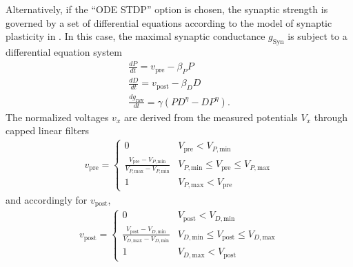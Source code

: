 \documentclass{article}
\begin{document}
Alternatively, if the ``ODE STDP'' option is chosen,
the synaptic strength is governed by a set of differential
equations according to the model of synaptic plasticity in
\cite{Abarbanel2002}. In this case, the maximal synaptic conductance
$g_{\text{Syn}}$ is subject to a differential equation system
\begin{align}
\frac{dP}{dt} = v_{\text{pre}} - \beta_P P \\
\frac{dD}{dt} = v_{\text{post}} - \beta_D D \\
\frac{dg_{\text{raw}}}{dt} = \gamma (P D^\eta - D P^\eta).
\end{align}
The normalized voltages $v_x$ are derived from the measured potentials
$V_x$ through capped linear filters
\begin{align}
v_{\text{pre}} = \left\{ \begin{array}{ll}
0 & V_{\text{pre}} < V_{P,\text{min}} \\
\frac{V_{\text{pre}}-V_{P, \text{min}}}{V_{P, \text{max}}-V_{P,
    \text{min}}} & V_{P, \text{min}}\leq V_{\text{pre}} \leq V_{P,
  \text{max}} \\
1 & V_{P, \text{max}} < V_{\text{pre}} 
\end{array} \right.
\end{align}
and accordingly for $v_{\text{post}}$,
\begin{align}
v_{\text{post}} = \left\{ \begin{array}{ll}
0 & V_{\text{post}} < V_{D,\text{min}} \\
\frac{V_{\text{post}}-V_{D, \text{min}}}{V_{D, \text{max}}-V_{D,
    \text{min}}} & V_{D, \text{min}}\leq V_{\text{post}} \leq V_{D,
  \text{max}} \\
1 & V_{D, \text{max}} < V_{\text{post}} 
\end{array} \right.
\end{align}
\vspace*{0.3cm}
\end{document}
